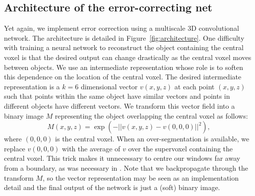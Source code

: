 \documentclass{article}
\begin{document}
\subsection{Architecture of the error-correcting net}
Yet again, we implement error correction using a multiscale 3D convolutional network. The architecture is detailed in Figure~\ref{fig:architecture}. One difficulty with training a neural network to reconstruct the object containing the central voxel is that the desired output can change drastically as the central voxel moves between objects. We use an intermediate representation whose role is to soften this dependence on the location of the central voxel. The desired intermediate representation is a $k=6$ dimensional vector $v(x,y,z)$ at each point $(x,y,z)$ such that points within the same object have similar vectors and points in different objects have different vectors. We transform this vector field into a binary image $M$ representing the object overlapping the central voxel as follows:
\begin{equation*}
	M(x,y,z)=\exp\left( -||v(x,y,z)-v(0,0,0)||^2 \right),
\end{equation*}
where $(0,0,0)$ is the central voxel. When an over-segmentation is available, we replace $v(0,0,0)$ with the average of $v$ over the supervoxel containing the central voxel. This trick makes it unnecessary to centre our windows far away from a boundary, as was necessary in \cite{floodfilling}. Note that we backpropagate through the transform $M$, so the vector representation may be seen as an implementation detail and the final output of the network is just a (soft) binary image.
\end{document}
